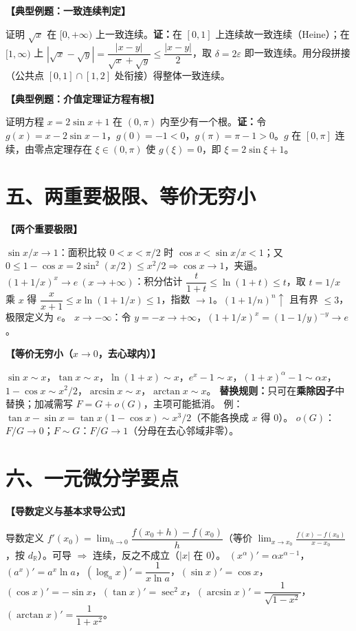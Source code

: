 \documentclass[12pt,a4paper,UTF8]{ctexart}
\newcommand{\R}{\mathbb R}
\newcommand{\eps}{\varepsilon}
\newenvironment{kp}[1]{\par\smallskip\noindent\textbf{【#1】}\par\nobreak\smallskip}{\par\smallskip}
\begin{document}
\begin{kp}{典型例题：一致连续判定}
证明 $\sqrt{x}$ 在 $[0,+\infty)$ 上一致连续。\textbf{证：}在 $[0,1]$ 上连续故一致连续（Heine）；在 $[1,\infty)$ 上 $|\sqrt x-\sqrt y|=\dfrac{|x-y|}{\sqrt x+\sqrt y}\le\dfrac{|x-y|}{2}$，取 $\delta=2\eps$ 即一致连续。用分段拼接（公共点 $[0,1]\cap[1,2]$ 处衔接）得整体一致连续。
\end{kp}

\begin{kp}{典型例题：介值定理证方程有根}
证明方程 $x=2\sin x+1$ 在 $(0,\pi)$ 内至少有一个根。\textbf{证：}令 $g(x)=x-2\sin x-1$，$g(0)=-1<0$，$g(\pi)=\pi-1>0$。$g$ 在 $[0,\pi]$ 连续，由零点定理存在 $\xi\in(0,\pi)$ 使 $g(\xi)=0$，即 $\xi=2\sin\xi+1$。
\end{kp}

\section*{五、两重要极限、等价无穷小}

\begin{kp}{两个重要极限}
$\sin x/x\to1$：面积比较 $0<x<\pi/2$ 时 $\cos x<\sin x/x<1$；又 $0\le1-\cos x=2\sin^2(x/2)\le x^2/2\Rightarrow\cos x\to1$，夹逼。
$(1+1/x)^x\to e\ (x\to+\infty)$：积分估计 $\dfrac{t}{1+t}\le\ln(1+t)\le t$，取 $t=1/x$ 乘 $x$ 得 $\dfrac{x}{x+1}\le x\ln(1+1/x)\le1$，指数 $\to1$。$(1+1/n)^n\uparrow$ 且有界 $\le3$，极限定义为 $e$。
$x\to-\infty$：令 $y=-x\to+\infty$，$(1+1/x)^x=(1-1/y)^{-y}\to e$。
\end{kp}

\begin{kp}{等价无穷小（$x\to0$，去心球内）}
$\sin x\sim x$，$\tan x\sim x$，$\ln(1+x)\sim x$，$e^x-1\sim x$，$(1+x)^\alpha-1\sim\alpha x$，$1-\cos x\sim x^2/2$，$\arcsin x\sim x$，$\arctan x\sim x$。
\textbf{替换规则：}只可在\textbf{乘除因子}中替换；加减需写 $F=G+o(G)$，主项可能抵消。
例：$\tan x-\sin x=\tan x(1-\cos x)\sim x^3/2$（不能各换成 $x$ 得 0）。
$o(G)$：$F/G\to0$；$F\sim G$：$F/G\to1$（分母在去心邻域非零）。
\end{kp}

\section*{六、一元微分学要点}

\begin{kp}{导数定义与基本求导公式}
导数定义 $f'(x_0)=\lim_{h\to0}\dfrac{f(x_0+h)-f(x_0)}{h}$（等价 $\lim_{x\to x_0}\frac{f(x)-f(x_0)}{x-x_0}$，按 $d_\R$）。可导 $\Rightarrow$ 连续，反之不成立（$|x|$ 在 0）。
$(x^\alpha)'=\alpha x^{\alpha-1}$，$(a^x)'=a^x\ln a$，$(\log_a x)'=\dfrac{1}{x\ln a}$，$(\sin x)'=\cos x$，$(\cos x)'=-\sin x$，$(\tan x)'=\sec^2x$，$(\arcsin x)'=\dfrac{1}{\sqrt{1-x^2}}$，$(\arctan x)'=\dfrac{1}{1+x^2}$。
\end{kp}
\end{document}
